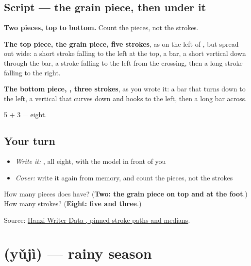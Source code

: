 \subsection*{Script — the grain piece, then  under it}

\begin{quote}
\end{quote}

\textbf{Two pieces, top to bottom.} Count the pieces, not the strokes.

\textbf{The top piece, the grain piece, five strokes}, as on the left of , but spread out wide: a short stroke falling to the left at the top, a bar, a short vertical down through the bar, a stroke falling to the left from the crossing, then a long stroke falling to the right.

\textbf{The bottom piece, , three strokes}, as you wrote it: a bar that turns down to the left, a vertical that curves down and hooks to the left, then a long bar across.

5 + 3 = eight.

\subsection*{Your turn}
\begin{itemize}
\raggedright
  \item \emph{Write it:} , all eight, with the model in front of you
  \item \emph{Cover:} write it again from memory, and count the pieces, not the strokes
\end{itemize}

\begin{tcolorbox}[breakable,colback=teal!4,colframe=teal!35!black,title={Before you move on}]
How many pieces does  have? (\textbf{Two: the grain piece on top and  at the foot}.) How many strokes? (\textbf{Eight: five and three}.)

Source: \href{https://raw.githubusercontent.com/chanind/hanzi-writer-data/68d10a4b21150cae5e1ebbd223eed289cf32d90c/data/\%E5\%AD\%A3.json}{Hanzi Writer Data , pinned stroke paths and medians}.
\end{tcolorbox}
\section[\texorpdfstring{\zh{雨季} (yǔjì)}{雨季 (yǔjì)}]{ (yǔjì) — rainy season}

